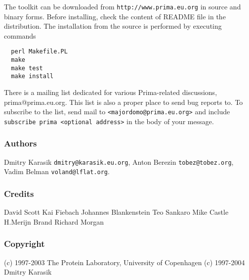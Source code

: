 \documentclass{report}
\begin{document}
The toolkit can be downloaded from \texttt{http://www.prima.eu.org} in
source and binary forms. Before installing, check the content of README file
in the distribution. The installation from the source is performed by
executing commands
\begin{verbatim}
  perl Makefile.PL
  make
  make test
  make install
\end{verbatim}

There is a mailing list dedicated for various Prima-related discussions, 
prima@prima.eu.org. This list is also a proper place to send bug reports to. 
To subscribe to the list, send mail to \texttt{<majordomo@prima.eu.org>} and 
include \texttt{subscribe prima <optional address>} in the body of your message.

\subsubsection{Authors}

Dmitry Karasik \texttt{dmitry@karasik.eu.org},
Anton Berezin \texttt{tobez@tobez.org},
Vadim Belman \texttt{voland@lflat.org}.

\subsubsection{Credits}

David Scott
Kai Fiebach
Johannes Blankenstein
Teo Sankaro
Mike Castle
H.Merijn Brand
Richard Morgan

\subsubsection{Copyright}

(c) 1997-2003 The Protein Laboratory, University of Copenhagen
(c) 1997-2004 Dmitry Karasik
\end{document}

